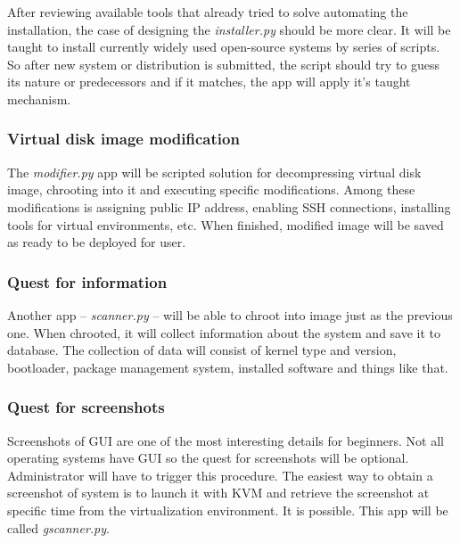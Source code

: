 \documentclass[thesis=B,english]{FITthesis}[2013/04/26]
\newcommand{\myparagraph}[1]{\paragraph{#1}\mbox{}\\}
\begin{document}

After reviewing available tools that already tried to solve automating the installation, the case of designing the \emph{installer.py} should be more clear. It will be taught to install currently widely used open-source systems by series of scripts. So after new system or distribution is submitted, the script should try to guess its nature or predecessors and if it matches, the app will apply it's taught mechanism.

\subsubsection{Virtual disk image modification}

The \emph{modifier.py} app will be scripted solution for decompressing virtual disk image, chrooting into it and executing specific modifications. Among these modifications is assigning public IP address, enabling SSH connections, installing tools for virtual environments, etc. When finished, modified image will be saved as ready to be deployed for user.


\subsubsection{Quest for information}

Another app -- \emph{scanner.py} -- will be able to chroot into image just as the previous one. When chrooted, it will collect information about the system and save it to database. The collection of data will consist of kernel type and version, bootloader, package management system, installed software and things like that.

\subsubsection{Quest for screenshots}

Screenshots of GUI are one of the most interesting details for beginners. Not all operating systems have GUI so the quest for screenshots will be optional. Administrator will have to trigger this procedure. The easiest way to obtain a screenshot of system is to launch it with KVM and retrieve the screenshot at specific time from the virtualization environment. It is possible. This app will be called \emph{gscanner.py}.
\end{document}
